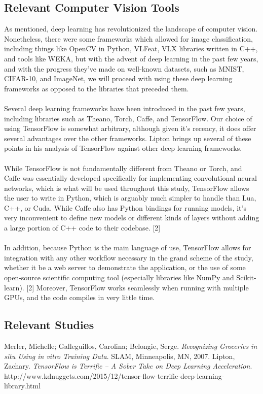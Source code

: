 \documentclass{article}
\begin{document}
\subsection{Relevant Computer Vision Tools}
As mentioned, deep learning has revolutionized the landscape of computer vision. Nonetheless, there were some frameworks which allowed for image classification, including things like OpenCV in Python, VLFeat, VLX libraries written in C++, and tools like WEKA, but with the advent of deep learning in the past few years, and with the progress they've made on well-known datasets, such as MNIST, CIFAR-10, and ImageNet, we will proceed with using these deep learning frameworks as opposed to the libraries that preceded them. \\ \\
Several deep learning frameworks have been introduced in the past few years, including libraries such as Theano, Torch, Caffe, and TensorFlow. Our choice of using TensorFlow is somewhat arbitrary, although given it's recency, it does offer several advantages over the other frameworks. Lipton brings up several of these points in his analysis of TensorFlow against other deep learning frameworks. \\ \\
While TensorFlow is not fundamentally different from Theano or Torch, and Caffe was essentially developed specifically for implementing convolutional neural networks, which is what will be used throughout this study, TensorFlow allows the user to write in Python, which is arguably much simpler to handle than Lua, C++, or Cuda. While Caffe also has Python bindings for running models, it's very inconvenient to define new models or different kinds of layers without adding a large portion of C++ code to their codebase. [2]\\ \\
In addition, because Python is the main language of use, TensorFlow allows for integration with any other workflow necessary in the grand scheme of the study, whether it be a web server to demonstrate the application, or the use of some open-source scientific computing tool (especially libraries like NumPy and Scikit-learn). [2] Moreover, TensorFlow works seamlessly when running with multiple GPUs, and the code compiles in very little time. 
\subsection{Relevant Studies}
\begin{thebibliography}{9}
Merler, Michelle; Galleguillos, Carolina; Belongie, Serge.
\textit{Recognizing Groceries in situ Using in vitro Training Data}. 
SLAM, Minneapolis, MN, 2007.
Lipton, Zachary.
\textit{TensorFlow is Terrific – A Sober Take on Deep Learning Acceleration}.
http://www.kdnuggets.com/2015/12/tensor-flow-terrific-deep-learning-library.html
\end{thebibliography}
\end{document}
